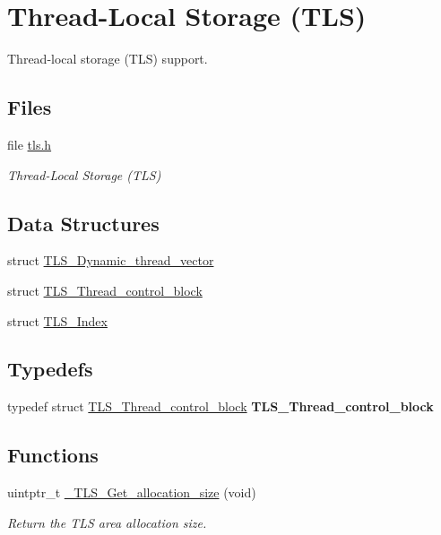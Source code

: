 \hypertarget{group__RTEMSScoreTLS}{}\section{Thread-\/\+Local Storage (T\+LS)}
\label{group__RTEMSScoreTLS}


Thread-\/local storage (T\+LS) support.  


\subsection*{Files}
\begin{DoxyCompactItemize}
\item 
file \mbox{\hyperlink{tls_8h}{tls.\+h}}
\begin{DoxyCompactList}\small\item\em Thread-\/\+Local Storage (T\+LS) \end{DoxyCompactList}\end{DoxyCompactItemize}
\subsection*{Data Structures}
\begin{DoxyCompactItemize}
\item 
struct \mbox{\hyperlink{structTLS__Dynamic__thread__vector}{T\+L\+S\+\_\+\+Dynamic\+\_\+thread\+\_\+vector}}
\item 
struct \mbox{\hyperlink{structTLS__Thread__control__block}{T\+L\+S\+\_\+\+Thread\+\_\+control\+\_\+block}}
\item 
struct \mbox{\hyperlink{structTLS__Index}{T\+L\+S\+\_\+\+Index}}
\end{DoxyCompactItemize}
\subsection*{Typedefs}
\begin{DoxyCompactItemize}
\item 
\mbox{\label{group__RTEMSScoreTLS_gaeb5cfefd494a5932265a9be8ea01e17d}} 
typedef struct \mbox{\hyperlink{structTLS__Thread__control__block}{T\+L\+S\+\_\+\+Thread\+\_\+control\+\_\+block}} {\bfseries T\+L\+S\+\_\+\+Thread\+\_\+control\+\_\+block}
\end{DoxyCompactItemize}
\subsection*{Functions}
\begin{DoxyCompactItemize}
\item 
uintptr\+\_\+t \mbox{\hyperlink{group__RTEMSScoreTLS_ga895642c73096b9995106694f3b0832d5}{\+\_\+\+T\+L\+S\+\_\+\+Get\+\_\+allocation\+\_\+size}} (void)
\begin{DoxyCompactList}\small\item\em Return the T\+LS area allocation size. \end{DoxyCompactList}\end{DoxyCompactItemize}
